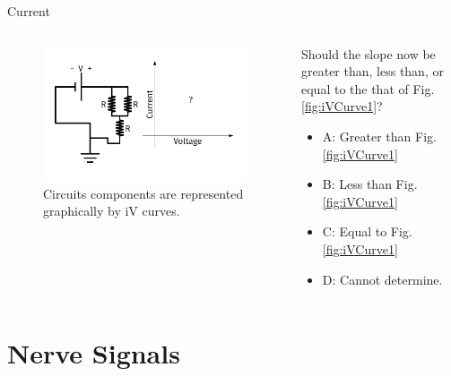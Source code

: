 \documentclass{beamer}
\begin{document}
\begin{frame}{Current}
\begin{columns}[T]
\begin{column}{0.5\textwidth}
\begin{figure}
\centering
\includegraphics[width=\textwidth,trim=0.5cm 0cm 1cm 0cm,clip=true]{figures/iVCurve4.pdf}
\caption{\label{fig:iVCurve4} Circuits components are represented graphically by iV curves.}
\end{figure}
\end{column}
\begin{column}{0.5\textwidth}
\small
Should the slope now be greater than, less than, or equal to the that of Fig. \ref{fig:iVCurve1}?
\begin{itemize}
\item A: Greater than Fig. \ref{fig:iVCurve1}
\item B: Less than Fig. \ref{fig:iVCurve1}
\item C: Equal to Fig. \ref{fig:iVCurve1}
\item D: Cannot determine.
\end{itemize}
\end{column}
\end{columns}
\end{frame}

\section{Nerve Signals}
\end{document}
